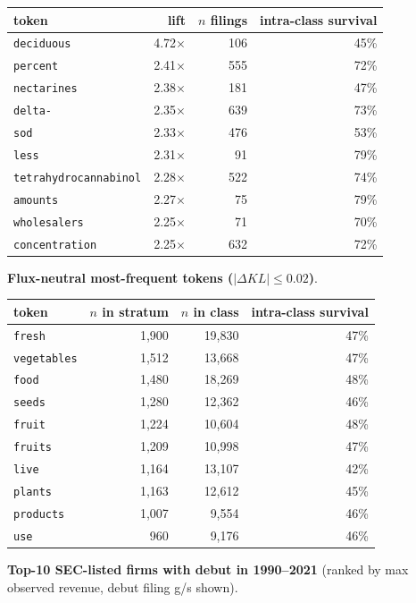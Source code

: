 \begin{tabular}{lrrr}
\toprule
token & lift & $n$ filings & intra-class survival \\
\midrule
\texttt{deciduous} & 4.72$\times$ & 106 & 45\% \\
\texttt{percent} & 2.41$\times$ & 555 & 72\% \\
\texttt{nectarines} & 2.38$\times$ & 181 & 47\% \\
\texttt{delta-} & 2.35$\times$ & 639 & 73\% \\
\texttt{sod} & 2.33$\times$ & 476 & 53\% \\
\texttt{less} & 2.31$\times$ & 91 & 79\% \\
\texttt{tetrahydrocannabinol} & 2.28$\times$ & 522 & 74\% \\
\texttt{amounts} & 2.27$\times$ & 75 & 79\% \\
\texttt{wholesalers} & 2.25$\times$ & 71 & 70\% \\
\texttt{concentration} & 2.25$\times$ & 632 & 72\% \\
\bottomrule
\end{tabular}

\textbf{Flux-neutral most-frequent tokens ($|\Delta KL|\leq 0.02$)}.

\begin{tabular}{lrrr}
\toprule
token & $n$ in stratum & $n$ in class & intra-class survival \\
\midrule
\texttt{fresh} & 1,900 & 19,830 & 47\% \\
\texttt{vegetables} & 1,512 & 13,668 & 47\% \\
\texttt{food} & 1,480 & 18,269 & 48\% \\
\texttt{seeds} & 1,280 & 12,362 & 46\% \\
\texttt{fruit} & 1,224 & 10,604 & 48\% \\
\texttt{fruits} & 1,209 & 10,998 & 47\% \\
\texttt{live} & 1,164 & 13,107 & 42\% \\
\texttt{plants} & 1,163 & 12,612 & 45\% \\
\texttt{products} & 1,007 & 9,554 & 46\% \\
\texttt{use} & 960 & 9,176 & 46\% \\
\bottomrule
\end{tabular}

\textbf{Top-10 SEC-listed firms with debut in 1990--2021} (ranked by max observed revenue, debut filing g/s shown).

